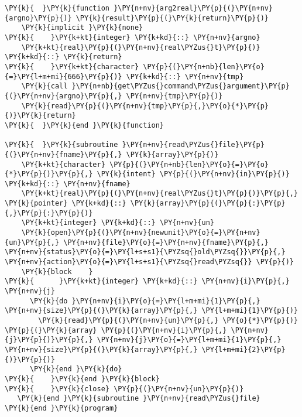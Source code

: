\begin{Verbatim}[commandchars=\\\{\}]
\PY{k}{  }\PY{k}{function }\PY{n+nv}{arg2real}\PY{p}{(}\PY{n+nv}{argno}\PY{p}{)} \PY{k}{result}\PY{p}{(}\PY{k}{return}\PY{p}{)}
    \PY{k}{implicit }\PY{k}{none}
\PY{k}{    }\PY{k+kt}{integer} \PY{k+kd}{::} \PY{n+nv}{argno}
    \PY{k+kt}{real}\PY{p}{(}\PY{n+nv}{real\PYZus{}t}\PY{p}{)} \PY{k+kd}{::} \PY{k}{return}
\PY{k}{    }\PY{k+kt}{character} \PY{p}{(}\PY{n+nb}{len}\PY{o}{=}\PY{l+m+mi}{666}\PY{p}{)} \PY{k+kd}{::} \PY{n+nv}{tmp}
    \PY{k}{call }\PY{n+nb}{get\PYZus{}command\PYZus{}argument}\PY{p}{(}\PY{n+nv}{argno}\PY{p}{,} \PY{n+nv}{tmp}\PY{p}{)}
    \PY{k}{read}\PY{p}{(}\PY{n+nv}{tmp}\PY{p}{,}\PY{o}{*}\PY{p}{)}\PY{k}{return}
\PY{k}{  }\PY{k}{end }\PY{k}{function}

\PY{k}{  }\PY{k}{subroutine }\PY{n+nv}{read\PYZus{}file}\PY{p}{(}\PY{n+nv}{fname}\PY{p}{,} \PY{k}{array}\PY{p}{)}
    \PY{k+kt}{character} \PY{p}{(}\PY{n+nb}{len}\PY{o}{=}\PY{o}{*}\PY{p}{)}\PY{p}{,} \PY{k}{intent} \PY{p}{(}\PY{n+nv}{in}\PY{p}{)} \PY{k+kd}{::} \PY{n+nv}{fname}
    \PY{k+kt}{real}\PY{p}{(}\PY{n+nv}{real\PYZus{}t}\PY{p}{)}\PY{p}{,} \PY{k}{pointer} \PY{k+kd}{::} \PY{k}{array}\PY{p}{(}\PY{p}{:}\PY{p}{,}\PY{p}{:}\PY{p}{)}
    \PY{k+kt}{integer} \PY{k+kd}{::} \PY{n+nv}{un}
    \PY{k}{open}\PY{p}{(}\PY{n+nv}{newunit}\PY{o}{=}\PY{n+nv}{un}\PY{p}{,} \PY{n+nv}{file}\PY{o}{=}\PY{n+nv}{fname}\PY{p}{,} \PY{n+nv}{status}\PY{o}{=}\PY{l+s+s1}{\PYZsq{}old\PYZsq{}}\PY{p}{,} \PY{n+nv}{action}\PY{o}{=}\PY{l+s+s1}{\PYZsq{}read\PYZsq{}} \PY{p}{)}
    \PY{k}{block    }
\PY{k}{      }\PY{k+kt}{integer} \PY{k+kd}{::} \PY{n+nv}{i}\PY{p}{,} \PY{n+nv}{j}
      \PY{k}{do }\PY{n+nv}{i}\PY{o}{=}\PY{l+m+mi}{1}\PY{p}{,} \PY{n+nv}{size}\PY{p}{(}\PY{k}{array}\PY{p}{,} \PY{l+m+mi}{1}\PY{p}{)}
        \PY{k}{read}\PY{p}{(}\PY{n+nv}{un}\PY{p}{,} \PY{o}{*}\PY{p}{)} \PY{p}{(}\PY{k}{array} \PY{p}{(}\PY{n+nv}{i}\PY{p}{,} \PY{n+nv}{j}\PY{p}{)}\PY{p}{,} \PY{n+nv}{j}\PY{o}{=}\PY{l+m+mi}{1}\PY{p}{,} \PY{n+nv}{size}\PY{p}{(}\PY{k}{array}\PY{p}{,} \PY{l+m+mi}{2}\PY{p}{)}\PY{p}{)}
      \PY{k}{end }\PY{k}{do}
\PY{k}{    }\PY{k}{end }\PY{k}{block}
\PY{k}{    }\PY{k}{close} \PY{p}{(}\PY{n+nv}{un}\PY{p}{)}
   \PY{k}{end }\PY{k}{subroutine }\PY{n+nv}{read\PYZus{}file}
\PY{k}{end }\PY{k}{program}
\end{Verbatim}
